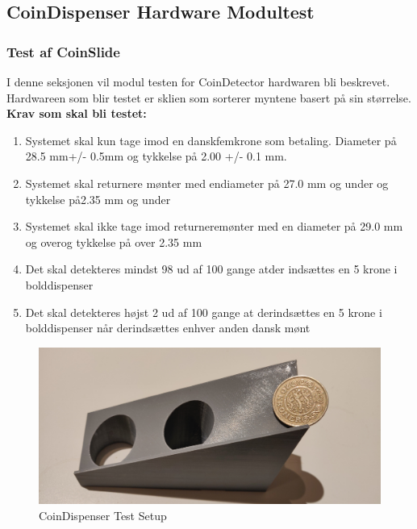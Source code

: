 \documentclass[Modultest/CoinDispenser/CoinDispenserModulTest.tex]{subfiles}
\begin{document}
\subsection{CoinDispenser Hardware Modultest} \label{sec:CoinModulTest}

\subsubsection{Test af CoinSlide}
I denne seksjonen vil modul testen for CoinDetector hardwaren bli beskrevet. Hardwareen som blir testet er sklien som sorterer myntene basert på sin størrelse.\\

\textbf{Krav som skal bli testet:}\\
\begin{enumerate}
    \item Systemet skal kun tage imod en danskfemkrone som betaling. Diameter på 28.5 mm+/- 0.5mm og tykkelse på 2.00 +/- 0.1 mm.
    \item Systemet skal returnere mønter med endiameter på 27.0 mm og under og tykkelse på2.35 mm og under
    \item Systemet skal ikke tage imod returneremønter med en diameter på 29.0 mm og overog tykkelse på over 2.35 mm
    \item Det skal detekteres mindst 98 ud af 100 gange atder indsættes en 5 krone i bolddispenser
    \item Det skal detekteres højst 2 ud af 100 gange at derindsættes en 5 krone i bolddispenser når derindsættes enhver anden dansk mønt
\end{enumerate}

\begin{figure}
    \centering
    \includegraphics[width=\textwidth]{Modultest/CoinDispenser/CoinHardwareModulTest/Graphic/CoinHardwareTestSetup.jpg}
    \caption{CoinDispenser Test Setup}
    \label{fig:CoinTestSetup}
\end{figure}
\end{document}
